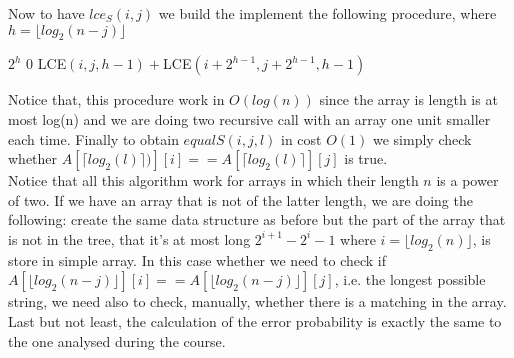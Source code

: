 \documentclass[a4paper]{article}
\begin{document}
Now to have $lce_S(i, j)$ we build the implement the following procedure, where $h=\lfloor log_2(n-j)\rfloor$
\begin{algorithmic}
    \State \Return $2^h$
\Else
        \State \Return $0$
    \Else
    	\State \Return LCE$(i, j,h-1) +$LCE$(i+2^{h-1},j+2^{h-1},h-1)$ 
    \EndIf
\EndIf
\EndFunction
\end{algorithmic}
Notice that, this procedure work in $O(log(n))$ since the array is length is at most log(n) and we are doing two recursive call with an array one unit smaller each time. Finally to obtain $equalS(i, j,\textit{l})$ in cost $O(1)$ we simply check whether $A[\lceil log_2(l) \rceil )][i]== A[\lceil log_2(l) \rceil ][j]$ is true. \\
Notice that all this algorithm work for arrays in which their length $n$ is a power of two. If we have an array that is not of the latter length, we are doing the following: create the same data structure as before but the part of the array that is not in the tree, that it's at most long $2^{i+1}-2^{i}-1$ where $i= \lfloor log_2(n)\rfloor$, is store in simple array. In this case whether we need to check if $A[\lfloor log_2(n-j)\rfloor][i]== A[\lfloor log_2(n-j)\rfloor][j]$, i.e. the longest possible string, we need also to check, manually, whether there is a matching in the array. Last but not least, the calculation of the error probability is exactly the same to the one analysed during the course.  
\end{document}
